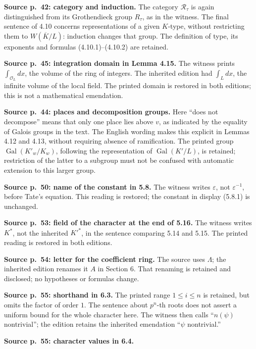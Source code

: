 \documentclass[10pt,letterpaper]{article}
\newcommand{\Gal}{\operatorname{Gal}}
\providecommand{\Gal}{\operatorname{Gal}}
\providecommand{\Gal}{\operatorname{Gal}}
\providecommand{\Gal}{\operatorname{Gal}}
\providecommand{\Gal}{\operatorname{Gal}}
\begin{document}
\begin{description}[style=nextline,leftmargin=2.6em,labelwidth=2.2em,font=\normalfont\bfseries]
\item[E42] \textbf{Source p.~42: category and induction.}
The category \(\mathcal R_\tau\) is again distinguished from its
Grothendieck group \(R_\tau\), as in the witness.
The final sentence of 4.10 concerns representations of a given \(K\)-type,
without restricting them to \(W(\overline K/L)\): induction changes that group.
The definition of type, its exponents and formulas (4.10.1)--(4.10.2) are retained.
\item[E43] \textbf{Source p.~45: integration domain in Lemma 4.15.}
The witness prints \(\int_{\mathcal O_L}dx\), the volume of the ring of integers.
The inherited edition had \(\int_L dx\), the infinite volume of the local field.
The printed domain is restored in both editions; this is not a mathematical emendation.
\item[E44] \textbf{Source p.~44: places and decomposition groups.}
Here ``does not decompose'' means that only one place lies above \(v\),
as indicated by the equality of Galois groups in the text. The English wording
makes this explicit in Lemmas 4.12 and 4.13, without requiring absence of ramification.
The printed group \(\Gal(K'_w/K_w)\), following the representation of \(\Gal(K'/L)\),
is retained; restriction of the latter to a subgroup must not be confused with
automatic extension to this larger group.
\item[E45] \textbf{Source p.~50: name of the constant in 5.8.}
The witness writes \(\varepsilon\), not \(\varepsilon^{-1}\), before Tate's equation.
This reading is restored; the constant in display (5.8.1) is unchanged.
\item[E46] \textbf{Source p.~53: field of the character at the end of 5.16.}
The witness writes \(K^*\), not the inherited \(K'^*\), in the sentence comparing 5.14 and 5.15.
The printed reading is restored in both editions.
\item[E47] \textbf{Source p.~54: letter for the coefficient ring.}
The source uses \(\Lambda\); the inherited edition renames it \(A\) in Section 6.
That renaming is retained and disclosed; no hypotheses or formulas change.
\item[E48] \textbf{Source p.~55: shorthand in 6.3.}
The printed range \(1\le i\le n\) is retained, but omits the factor of order \(1\).
The sentence about \(p^n\)-th roots does not assert a uniform bound for the whole character here.
The witness then calls ``\(n(\psi)\) nontrivial''; the edition retains the inherited emendation ``\(\psi\) nontrivial.''
\item[E49] \textbf{Source p.~55: character values in 6.4.}

\end{description}
\end{document}
